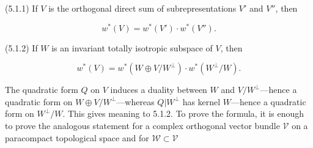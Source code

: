 \documentclass[9pt,twoside]{extarticle}
\begin{document}
{(5.1.1) If \(V\) is the orthogonal direct sum of subrepresentations \(V'\) and \(V''\), then\par

\[
w^*(V)=w^*(V')\cdot w^*(V'').
\]

(5.1.2) If \(W\) is an invariant totally isotropic subspace of \(V\), then\par

\[
w^*(V)=w^*(W\oplus V/W^\perp)\cdot w^*(W^\perp/W).
\]

The quadratic form \(Q\) on \(V\) induces a duality between \(W\) and \(V/W^\perp\)---hence a quadratic form on \(W\oplus V/W^\perp\)---whereas \(Q|W^\perp\) has kernel \(W\)---hence a quadratic form on \(W^\perp/W\). This gives meaning to 5.1.2. To prove the formula, it is enough to prove the analogous statement for a complex orthogonal vector bundle \(\mathscr V\) on a paracompact topological space and for \(\mathscr W\subset\mathscr V\)\par
}
\end{document}
